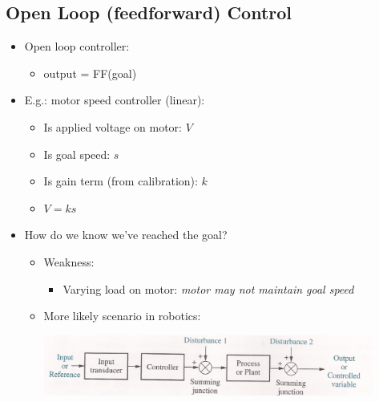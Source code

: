 \documentclass[10pt]{article}
\begin{document}
\subsection*{Open Loop (feedforward) Control}
\begin{itemize}
	\item Open loop controller:
	\begin{itemize}
        \item output = FF(goal)
    \end{itemize}
	\item E.g.: motor speed controller (linear):
	\begin{itemize}
        \item Is applied voltage on motor: $V$
        \item Is goal speed: $s$
        \item Is gain term (from calibration): $k$
        \item $V = ks$
    \end{itemize}
	\item How do we know we've reached the goal?
	\begin{itemize}
        \item Weakness:
        \begin{itemize}
            \item Varying load on motor: \textit{motor may not maintain goal speed}
        \end{itemize}
        \item More likely scenario in robotics:
        \begin{center} 
            \includegraphics*[width=0.9\textwidth]{L2_3.png} 
        \end{center}
    \end{itemize}    
\end{itemize}
\end{document}
